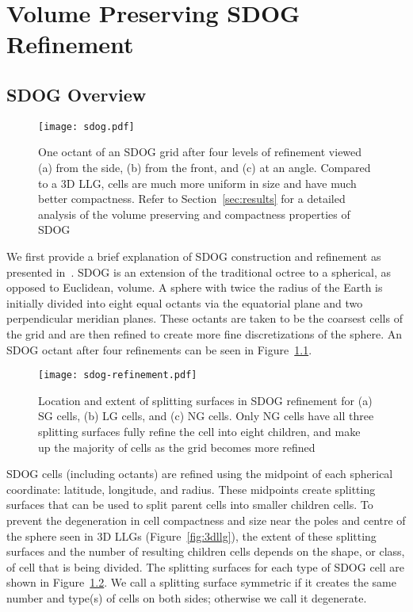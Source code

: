 \chapter{Volume Preserving SDOG Refinement} \label{chap:sdog}


\section{SDOG Overview}

\begin{figure}[tb]
	\texttt{[image: sdog.pdf]}
	\caption[Title]{
		One octant of an SDOG grid after four levels of refinement viewed (a) from the side, (b) from the front, and (c) at an angle.
		Compared to a 3D LLG, cells are much more uniform in size and have much better compactness.
		Refer to Section~\ref{sec:results} for a detailed analysis of the volume preserving and compactness properties of SDOG
	}
	\label{fig:sdog}
\end{figure}


We first provide a brief explanation of SDOG construction and refinement as presented in~\cite{yu2009sdog}.
SDOG is an extension of the traditional octree to a spherical, as opposed to Euclidean, volume.
A sphere with twice the radius of the Earth is initially divided into eight equal octants via the equatorial plane and two perpendicular meridian planes.
These octants are taken to be the coarsest cells of the grid and are then refined to create more fine discretizations of the sphere.
An SDOG octant after four refinements can be seen in Figure~\ref{fig:sdog}.


\begin{figure}[tb]
	\texttt{[image: sdog-refinement.pdf]}
	\caption[Title]{
		Location and extent of splitting surfaces in SDOG refinement for (a) SG cells, (b) LG cells, and (c) NG cells.
		Only NG cells have all three splitting surfaces fully refine the cell into eight children, and make up the majority of cells as the grid becomes more refined
	}
	\label{fig:sdog-refinement}
\end{figure}


SDOG cells (including octants) are refined using the midpoint of each spherical coordinate: latitude, longitude, and radius.
These midpoints create splitting surfaces that can be used to split parent cells into smaller children cells.
To prevent the degeneration in cell compactness and size near the poles and centre of the sphere seen in 3D LLGs (Figure~\ref{fig:3dllg}), the extent of these splitting surfaces and the number of resulting children cells depends on the shape, or class, of cell that is being divided.
The splitting surfaces for each type of SDOG cell are shown in Figure~\ref{fig:sdog-refinement}.
We call a splitting surface symmetric if it creates the same number and type(s) of cells on both sides; otherwise we call it degenerate.


